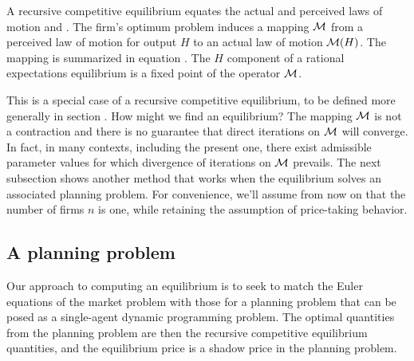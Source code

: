 \medskip
 A recursive competitive equilibrium
%
equates the actual and perceived laws of motion 
and .
 The firm's optimum problem induces a mapping ${\cal M}$
from a perceived law of motion for output $H$ to an actual
law of motion ${\cal M}(H)$.  The mapping is summarized in equation
.  The $H$ component of a  rational expectations equilibrium
is a fixed point of the operator ${\cal M}$.

This is a special case
of a recursive competitive equilibrium, to be defined
more generally in section  .
   How might we find an equilibrium?  The mapping ${\cal M}$ is not a contraction and  there is no guarantee that direct iterations
   on ${\cal M}$ will converge.
   In fact, in many contexts, including the present one, there exist admissible parameter values for which divergence of iterations on ${\cal M}$
   prevails.  The next subsection
shows another  method that works when the equilibrium solves
an associated planning problem.
For convenience, we'll assume from now on   that the number of firms $n$ is one, while
retaining the assumption of price-taking behavior.
%
%
%
%

\subsection{A planning problem}

Our approach to computing an equilibrium is to seek to match the Euler equations
of the market problem with those for a planning problem that can
be posed as a single-agent dynamic programming problem.
The optimal quantities from  the planning problem are then the
recursive competitive equilibrium quantities, and the equilibrium
price is a  shadow price in the planning problem.

